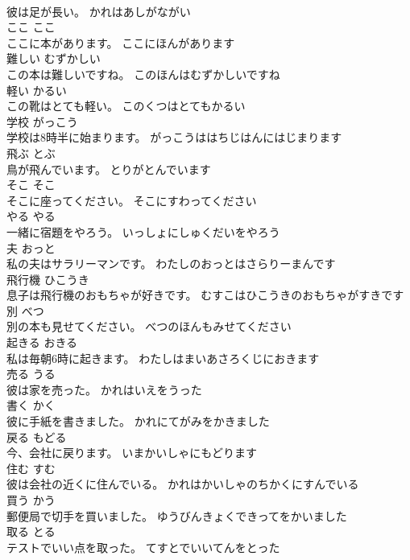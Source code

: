 \documentclass[8pt]{extreport}
\begin{document}
\begin{CJK}{UTF8}{min}
\\	彼は足が長い。	かれはあしがながい	
\\	ここ	ここ	
\\	ここに本があります。	ここにほんがあります	
\\	難しい	むずかしい	
\\	この本は難しいですね。	このほんはむずかしいですね	
\\	軽い	かるい	
\\	この靴はとても軽い。	このくつはとてもかるい	
\\	学校	がっこう	
\\	学校は8時半に始まります。	がっこうははちじはんにはじまります	
\\	飛ぶ	とぶ	
\\	鳥が飛んでいます。	とりがとんでいます	
\\	そこ	そこ	
\\	そこに座ってください。	そこにすわってください	
\\	やる	やる	
\\	一緒に宿題をやろう。	いっしょにしゅくだいをやろう	
\\	夫	おっと	
\\	私の夫はサラリーマンです。	わたしのおっとはさらりーまんです	
\\	飛行機	ひこうき	
\\	息子は飛行機のおもちゃが好きです。	むすこはひこうきのおもちゃがすきです	
\\	別	べつ	
\\	別の本も見せてください。	べつのほんもみせてください	
\\	起きる	おきる	
\\	私は毎朝6時に起きます。	わたしはまいあさろくじにおきます	
\\	売る	うる	
\\	彼は家を売った。	かれはいえをうった	
\\	書く	かく	
\\	彼に手紙を書きました。	かれにてがみをかきました	
\\	戻る	もどる	
\\	今、会社に戻ります。	いまかいしゃにもどります	
\\	住む	すむ	
\\	彼は会社の近くに住んでいる。	かれはかいしゃのちかくにすんでいる	
\\	買う	かう	
\\	郵便局で切手を買いました。	ゆうびんきょくできってをかいました	
\\	取る	とる	
\\	テストでいい点を取った。	てすとでいいてんをとった	

\end{CJK}
\end{document}
